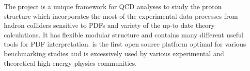 
The \fitter project is a unique framework for QCD analyses to study the proton 
structure which incorporates the most of the experimental data processes from hadron
colliders sensitive to PDFs and variety of the up-to date theory calculations. 
It has flexible modular structure and contains many different useful tools for PDF interpretation. 
\fitter is the first open source platform optimal for various benchmarking studies
and is excessively used by various experimental and theoretical high energy physics
communities.

